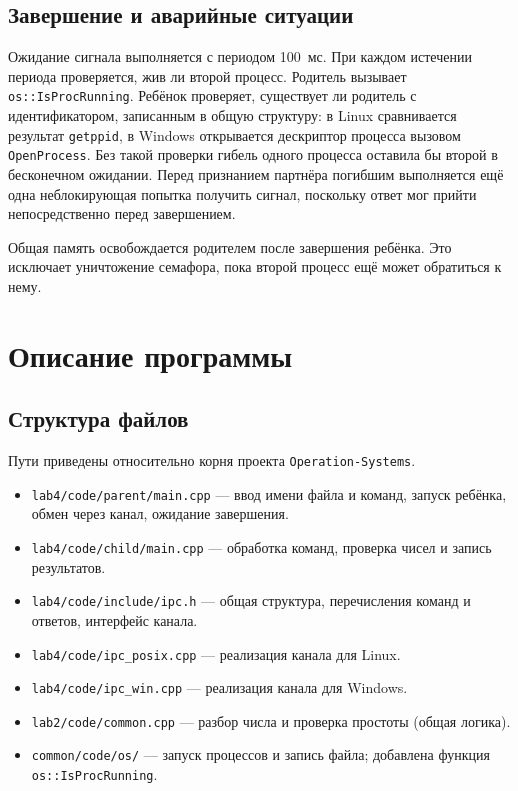 \subsection{Завершение и аварийные ситуации}
Ожидание сигнала выполняется с периодом 100~мс. При каждом истечении периода проверяется, жив ли второй процесс. Родитель вызывает \texttt{os::IsProcRunning}. Ребёнок проверяет, существует ли родитель с идентификатором, записанным в общую структуру: в Linux сравнивается результат \texttt{getppid}, в Windows открывается дескриптор процесса вызовом \texttt{OpenProcess}. Без такой проверки гибель одного процесса оставила бы второй в бесконечном ожидании. Перед признанием партнёра погибшим выполняется ещё одна неблокирующая попытка получить сигнал, поскольку ответ мог прийти непосредственно перед завершением.

Общая память освобождается родителем после завершения ребёнка. Это исключает уничтожение семафора, пока второй процесс ещё может обратиться к нему.

\section{Описание программы}
\subsection{Структура файлов}
Пути приведены относительно корня проекта \texttt{Operation-Systems}.

\begin{itemize}
\item \texttt{lab4/code/parent/main.cpp} --- ввод имени файла и команд, запуск ребёнка, обмен через канал, ожидание завершения.
\item \texttt{lab4/code/child/main.cpp} --- обработка команд, проверка чисел и запись результатов.
\item \texttt{lab4/code/include/ipc.h} --- общая структура, перечисления команд и ответов, интерфейс канала.
\item \texttt{lab4/code/ipc\_posix.cpp} --- реализация канала для Linux.
\item \texttt{lab4/code/ipc\_win.cpp} --- реализация канала для Windows.
\item \texttt{lab2/code/common.cpp} --- разбор числа и проверка простоты (общая логика).
\item \texttt{common/code/os/} --- запуск процессов и запись файла; добавлена функция \texttt{os::IsProcRunning}.
\end{itemize}

